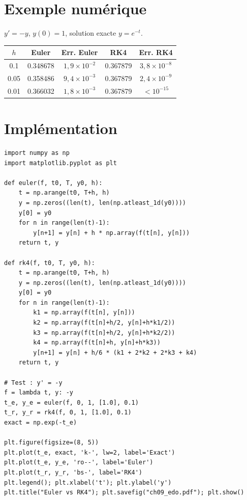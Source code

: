 \section{Exemple num\'erique}

$y'=-y$, $y(0)=1$, solution exacte $y=e^{-t}$.

\begin{center}
\begin{tabular}{ccccc}
\toprule
$h$ & Euler & Err. Euler & RK4 & Err. RK4 \\
\midrule
0.1 & 0.348678 & $1{,}9\times10^{-2}$ & 0.367879 & $3{,}8\times10^{-8}$ \\
0.05 & 0.358486 & $9{,}4\times10^{-3}$ & 0.367879 & $2{,}4\times10^{-9}$ \\
0.01 & 0.366032 & $1{,}8\times10^{-3}$ & 0.367879 & $<10^{-15}$ \\
\bottomrule
\end{tabular}
\end{center}

\section{Impl\'ementation}

\begin{codeblock}[title=\textbf{Python}]
\begin{verbatim}
import numpy as np
import matplotlib.pyplot as plt

def euler(f, t0, T, y0, h):
    t = np.arange(t0, T+h, h)
    y = np.zeros((len(t), len(np.atleast_1d(y0))))
    y[0] = y0
    for n in range(len(t)-1):
        y[n+1] = y[n] + h * np.array(f(t[n], y[n]))
    return t, y

def rk4(f, t0, T, y0, h):
    t = np.arange(t0, T+h, h)
    y = np.zeros((len(t), len(np.atleast_1d(y0))))
    y[0] = y0
    for n in range(len(t)-1):
        k1 = np.array(f(t[n], y[n]))
        k2 = np.array(f(t[n]+h/2, y[n]+h*k1/2))
        k3 = np.array(f(t[n]+h/2, y[n]+h*k2/2))
        k4 = np.array(f(t[n]+h, y[n]+h*k3))
        y[n+1] = y[n] + h/6 * (k1 + 2*k2 + 2*k3 + k4)
    return t, y

# Test : y' = -y
f = lambda t, y: -y
t_e, y_e = euler(f, 0, 1, [1.0], 0.1)
t_r, y_r = rk4(f, 0, 1, [1.0], 0.1)
exact = np.exp(-t_e)

plt.figure(figsize=(8, 5))
plt.plot(t_e, exact, 'k-', lw=2, label='Exact')
plt.plot(t_e, y_e, 'ro--', label='Euler')
plt.plot(t_r, y_r, 'bs-', label='RK4')
plt.legend(); plt.xlabel('t'); plt.ylabel('y')
plt.title("Euler vs RK4"); plt.savefig("ch09_edo.pdf"); plt.show()
\end{verbatim}
\end{codeblock}

